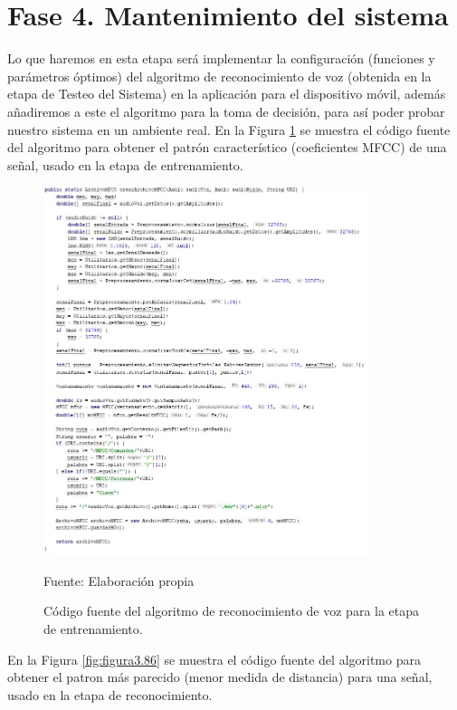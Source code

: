 \section{Fase 4. Mantenimiento del sistema}
Lo que haremos en esta etapa será implementar la configuración (funciones y parámetros óptimos) del algoritmo de reconocimiento de voz (obtenida en la etapa de Testeo del Sistema) en la aplicación para el dispositivo móvil, además añadiremos a este el algoritmo para la toma de decisión, para así poder probar nuestro sistema en un ambiente real.
\vskip 0.5cm
En la Figura \ref{fig:figura3.85} se muestra el código fuente del algoritmo para obtener el patrón característico (coeficientes MFCC) de una señal, usado en la etapa de entrenamiento.
\begin{figure}[H]
\captionsetup{justification=centering}
\begin{center}
\includegraphics[width=0.85\textwidth]{Imagenes/Cap3/image085}
\end{center}
\begin{center}
\vskip -0.5cm
\caption{\small{Código fuente del algoritmo de reconocimiento de voz para la etapa de entrenamiento.}}
\label{fig:figura3.85}
{\small{Fuente: Elaboración propia}}
\end{center}
\end{figure}
\newpage
En la Figura \ref{fig:figura3.86} se muestra el código fuente del algoritmo para obtener el patron más parecido (menor medida de distancia) para una señal, usado en la etapa de reconocimiento.

